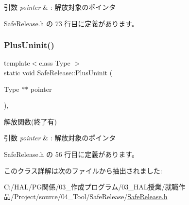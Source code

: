 \begin{DoxyParams}{引数}
{\em pointer} & \+: 解放対象のポインタ \\
\hline
\end{DoxyParams}


 Safe\+Release.\+h の 73 行目に定義があります。

\mbox{\label{class_safe_release_a06160f5466a88f021e6f28489de9df1e}} 
\subsubsection{\texorpdfstring{Plus\+Uninit()}{PlusUninit()}}
{\footnotesize\ttfamily template$<$class Type $>$ \\
static void Safe\+Release\+::\+Plus\+Uninit (\begin{DoxyParamCaption}\item[{Type $\ast$$\ast$}]{pointer }\end{DoxyParamCaption})\hspace{0.3cm}{\ttfamily [inline]}, {\ttfamily [static]}}



解放関数(終了有) 


\begin{DoxyParams}{引数}
{\em pointer} & \+: 解放対象のポインタ \\
\hline
\end{DoxyParams}


 Safe\+Release.\+h の 56 行目に定義があります。



このクラス詳解は次のファイルから抽出されました\+:\begin{DoxyCompactItemize}
\item 
C\+:/\+H\+A\+L/\+P\+G関係/03\+\_\+作成プログラム/03\+\_\+\+H\+A\+L授業/就職作品/\+Project/source/04\+\_\+\+Tool/\+Safe\+Release/\mbox{\hyperlink{_safe_release_8h}{Safe\+Release.\+h}}\end{DoxyCompactItemize}
